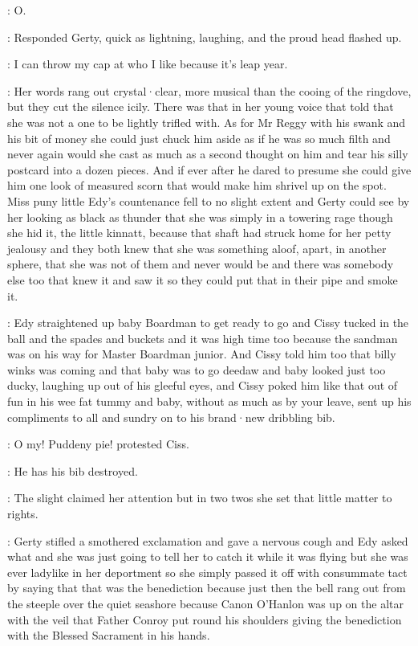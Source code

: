 \gerty:
O.

:
Responded Gerty,
quick as lightning,
laughing,
and the proud head
flashed up.

\gerty:
I can throw my cap at who I like
because it's leap year.

:
Her words rang out crystal·clear,
more musical than the cooing of the
ringdove,
but they cut the silence icily.
There was that in her young
voice that told that she was not a one to be lightly trifled with.
As for Mr Reggy with his swank and his bit of money she could just
chuck him aside as if he was so much filth and never again would she
cast as much as a second thought on him and tear his silly postcard
into a dozen pieces.
And if ever after he dared to presume she
could give him one look of measured scorn that would make him
shrivel up on the spot.
Miss puny little Edy's countenance fell
to no slight extent
and Gerty could see
by her looking as black as thunder
that she was simply in a towering rage
though she hid it,
the little kinnatt,
because that shaft had struck home for her petty jealousy
and they both knew that she was something aloof,
apart,
in another sphere,
that she was not of them and never would be and there was somebody else
too that knew it and saw it so they could put that in their pipe
and smoke it.

:
Edy straightened up baby Boardman to get ready to go and Cissy
tucked in the ball and the spades and buckets and it was high time too
because the sandman was on his way for Master Boardman junior.
And
Cissy told him too that billy winks was coming and that baby was to go
deedaw and baby looked just too ducky,
laughing up out of his gleeful eyes,
and Cissy poked him like that
out of fun
in his wee fat tummy
and baby,
without as much as by your leave,
sent up his compliments to all
and sundry on to his brand·new dribbling bib.

\cissy:
O my!
Puddeny pie!
protested Ciss.

\cissy:
He has his bib destroyed.

:
The slight  claimed her attention but in two twos she set
that little matter to rights.

:
Gerty stifled a smothered exclamation and gave a nervous cough and
Edy asked what and she was just going to tell her to catch it while it was
flying but she was ever ladylike in her deportment so she simply passed it
off with consummate tact by saying that that was the benediction because
just then the bell rang out from the steeple
over the quiet seashore
because Canon O'Hanlon was up on the altar with the veil that Father
Conroy put round his shoulders giving the benediction with the Blessed
Sacrament in his hands.

